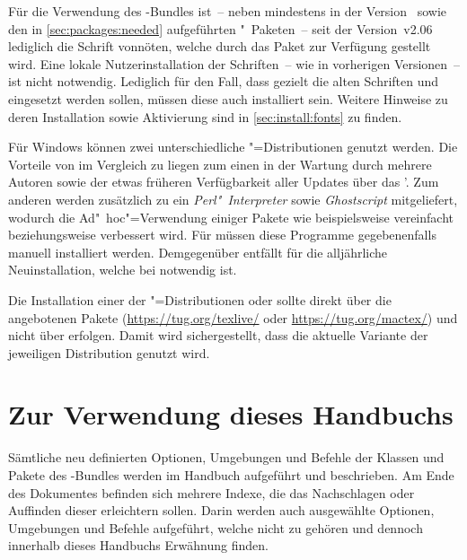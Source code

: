 Für die Verwendung des \TUDScript-Bundles ist~-- neben \KOMAScript{} mindestens 
in der Version~\vKOMAScript{} sowie den in \autoref{sec:packages:needed} 
aufgeführten "~Paketen~-- seit der Version~v2.06 lediglich die 
Schrift \OpenSans vonnöten, welche durch das Paket  zur 
Verfügung gestellt wird. Eine lokale Nutzerinstallation der Schriften~-- wie in 
vorherigen Versionen~-- ist nicht notwendig. Lediglich für den Fall, dass 
gezielt die alten Schriften \Univers und \DIN eingesetzt werden sollen, müssen 
diese auch installiert sein. Weitere Hinweise zu deren Installation sowie 
Aktivierung sind in \autoref{sec:install:fonts} zu finden.

Für Windows können zwei unterschiedliche "=Distributionen genutzt 
werden. Die Vorteile von  im Vergleich zu 
 liegen zum einen in der Wartung durch mehrere 
Autoren sowie der etwas früheren Verfügbarkeit aller Updates über das \CTAN'. 
Zum anderen werden zusätzlich zu  ein \emph{Perl"~Interpreter} 
sowie \emph{Ghostscript} mitgeliefert, wodurch die Ad"~hoc"=Verwendung einiger 
Pakete wie beispielsweise  vereinfacht beziehungsweise 
verbessert wird. Für  müssen diese Programme 
gegebenenfalls manuell installiert werden. Demgegenüber entfällt für 
 die alljährliche Neuinstallation, welche bei 
 notwendig ist.

Die Installation einer der "=Distributionen 
 oder  sollte 
direkt über die angebotenen Pakete (\url{https://tug.org/texlive/} oder 
\url{https://tug.org/mactex/}) und nicht über  erfolgen. 
Damit wird sichergestellt, dass die aktuelle Variante der jeweiligen 
Distribution genutzt wird.



\section{Zur Verwendung dieses Handbuchs}
%
%
%
%
Sämtliche neu definierten Optionen, Umgebungen und Befehle der Klassen und 
Pakete des \TUDScript-Bundles werden im Handbuch aufgeführt und beschrieben. Am 
Ende des Dokumentes befinden sich mehrere Indexe, die das Nachschlagen oder 
Auffinden dieser erleichtern sollen. Darin werden auch ausgewählte Optionen, 
Umgebungen und Befehle aufgeführt, welche nicht zu \TUDScript gehören und 
dennoch innerhalb dieses Handbuchs Erwähnung finden.

